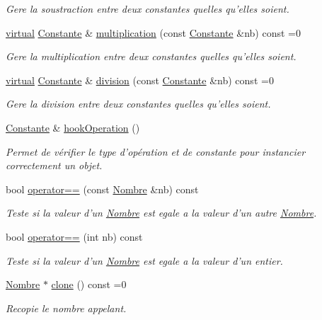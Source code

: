 \begin{DoxyCompactItemize}
\begin{DoxyCompactList}\small\item\em \-Gere la soustraction entre deux constantes quelles qu'elles soient. \end{DoxyCompactList}\item 
\hyperlink{classvirtual}{virtual} \hyperlink{class_l_o21_1_1_constante}{\-Constante} \& \hyperlink{class_l_o21_1_1_nombre_a63cf8dbd304585fe106e8eeebe8c4e89}{multiplication} (const \hyperlink{class_l_o21_1_1_constante}{\-Constante} \&nb) const =0
\begin{DoxyCompactList}\small\item\em \-Gere la multiplication entre deux constantes quelles qu'elles soient. \end{DoxyCompactList}\item 
\hyperlink{classvirtual}{virtual} \hyperlink{class_l_o21_1_1_constante}{\-Constante} \& \hyperlink{class_l_o21_1_1_nombre_aafde3453c22512a8ca152f4013d0f08f}{division} (const \hyperlink{class_l_o21_1_1_constante}{\-Constante} \&nb) const =0
\begin{DoxyCompactList}\small\item\em \-Gere la division entre deux constantes quelles qu'elles soient. \end{DoxyCompactList}\item 
\hyperlink{class_l_o21_1_1_constante}{\-Constante} \& \hyperlink{class_l_o21_1_1_nombre_a27247b37ee0159071efbd64bc73d852c}{hook\-Operation} ()
\begin{DoxyCompactList}\small\item\em \-Permet de vérifier le type d'opération et de constante pour instancier correctement un objet. \end{DoxyCompactList}\item 
bool \hyperlink{class_l_o21_1_1_nombre_a13d1275bac5b339723ee7b033461c9a4}{operator==} (const \hyperlink{class_l_o21_1_1_nombre}{\-Nombre} \&nb) const 
\begin{DoxyCompactList}\small\item\em \-Teste si la valeur d'un \hyperlink{class_l_o21_1_1_nombre}{\-Nombre} est egale a la valeur d'un autre \hyperlink{class_l_o21_1_1_nombre}{\-Nombre}. \end{DoxyCompactList}\item 
bool \hyperlink{class_l_o21_1_1_nombre_ab0d95d7d706e176ee9121feecacf3be7}{operator==} (int nb) const 
\begin{DoxyCompactList}\small\item\em \-Teste si la valeur d'un \hyperlink{class_l_o21_1_1_nombre}{\-Nombre} est egale a la valeur d'un entier. \end{DoxyCompactList}\item 
\hyperlink{class_l_o21_1_1_nombre}{\-Nombre} $\ast$ \hyperlink{class_l_o21_1_1_nombre_aea071e3bcebfdc9337eaea8515e248c9}{clone} () const =0
\begin{DoxyCompactList}\small\item\em \-Recopie le nombre appelant. \end{DoxyCompactList}\end{DoxyCompactItemize}


